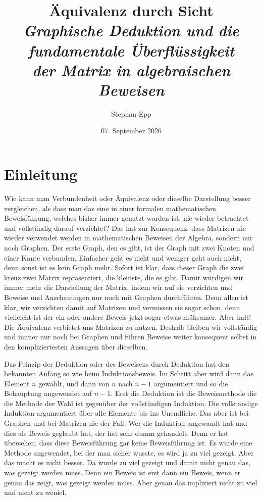\documentclass[12pt, a4paper]{article}
\title{\textbf{Äquivalenz durch Sicht}\\[0.5em]
  {\Large\itshape Graphische Deduktion und die fundamentale Überflüssigkeit\\ der Matrix in algebraischen Beweisen}}
\author{Stephan Epp}
\date{07. September 2026}
\theoremstyle{definition}
\theoremstyle{remark}
\begin{document}

\maketitle
\tableofcontents
\newpage

\section{Einleitung}
\label{sec:einleitung}

Wie kann man Verbundenheit oder Äquivalenz oder dieselbe Darstellung besser vergleichen, als dass man das eine in einer formalen mathematischen Beweisführung, welches bisher immer genutzt worden ist, nie wieder betrachtet und vollständig darauf verzichtet? Das hat zur Konsequenz, dass Matrizen nie wieder verwendet werden in mathematischen Beweisen der Algebra, sondern nur noch Graphen. Der erste Graph, den es gibt, ist der Graph mit zwei Knoten und einer Kante verbunden. Einfacher geht es nicht und weniger geht auch nicht, denn sonst ist es kein Graph mehr. Sofort ist klar, dass dieser Graph die zwei kreuz zwei Matrix repräsentiert, die kleinste, die es gibt. Damit würdigen wir immer mehr die Darstellung der Matrix, indem wir auf sie verzichten und Beweise und Anschauungen nur noch mit Graphen durchführen. Denn allen ist klar, wir verzichten damit auf Matrizen und vermissen sie sogar schon, denn vielleicht ist der ein oder andere Beweis jetzt sogar etwas mühsamer. Aber halt! Die Äquivalenz verbietet uns Matrizen zu nutzen. Deshalb bleiben wir vollständig und immer nur noch bei Graphen und führen Beweise weiter konsequent selbst in den kompliziertesten Aussagen über dieselben.

Das Prinzip der Deduktion oder des Beweisens durch Deduktion hat den bekannten Anfang so wie beim Induktionsbeweis. Im Schritt aber wird dann das Element $n$ gewählt, und dann von $n$ nach $n-1$ argumentiert und so die Behauptung angewendet auf $n-1$. Erst die Deduktion ist die Beweismethode die die Methode der Wahl ist gegenüber der vollständigen Induktion. Die vollständige Induktion argumentiert über alle Elemente bis ins Unendliche. Das aber ist bei Graphen und bei Matrizen nie der Fall. Wer die Induktion angewandt hat und dies als Beweis geglaubt hat, der hat sehr dumm gehandelt. Denn er hat übersehen, dass diese Beweisführung gar keine Beweisführung ist. Es wurde eine Methode angewendet, bei der man sicher wusste, es wird ja zu viel gezeigt. Aber das macht es nicht besser. Da wurde zu viel gezeigt und damit nicht genau das, was gezeigt werden muss. Denn ein Beweis ist erst dann ein Beweis, wenn er genau das zeigt, was gezeigt werden muss. Aber genau das impliziert nicht zu viel und nicht zu weniel.
\end{document}
